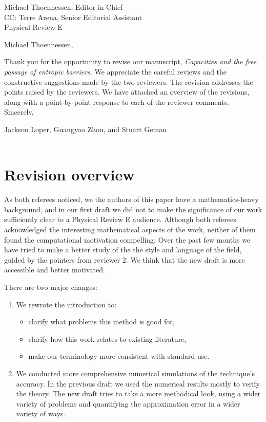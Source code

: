 \documentclass{article}
\begin{document}
\hfill{}\begin{minipage}{4in}
\raggedleft
Michael Thoennessen, Editor in Chief\\
CC: Terre Arena, Senior Editorial Assistant\\
Physical Review E\\
\end{minipage}

\vspace{.5in}

\noindent
Michael Thoennessen,

\vspace{.2in}

Thank you for the opportunity to revise our manuscript, {\em Capacities and the free passage of entropic barriers}. We appreciate the careful reviews and the constructive suggestions made by the two reviewers.   The revision addresses the points raised by the reviewers. We have attached an overview of the revisions, along with a point-by-point response to each of the reviewer comments. \\

\noindent
Sincerely,

Jackson Loper, Guangyao Zhou, and Stuart Geman\\\\


\newpage

\section{Revision overview}

As both referees noticed, we the authors of this paper have a mathematics-heavy background, and in our first draft we did not to make the significance of our work sufficiently clear to a Physical Review E audience.   Although both referees acknowledged the interesting mathematical aspects of the work, neither of them found the computational motivation compelling.  Over the past few months we have tried to make a better study of the the style and language of the field, guided by the pointers from reviewer 2.  We think that the new draft is more accessible and better motivated.

There are two major changes:
\begin{enumerate}
    \item We rewrote the introduction to:
    \begin{itemize}
        \item clarify what problems this method is good for,
        \item clarify how this work relates to existing literature,
        \item make our terminology more consistent with standard use.
    \end{itemize}
    \item We conducted more comprehensive numerical simulations of the technique's accuracy.  In the previous draft we used the numerical results mostly to verify the theory.  The new draft tries to take a more methodical look, using a wider variety of problems and quantifying the approximation error in a wider variety of ways.  
\end{enumerate}
\end{document}
